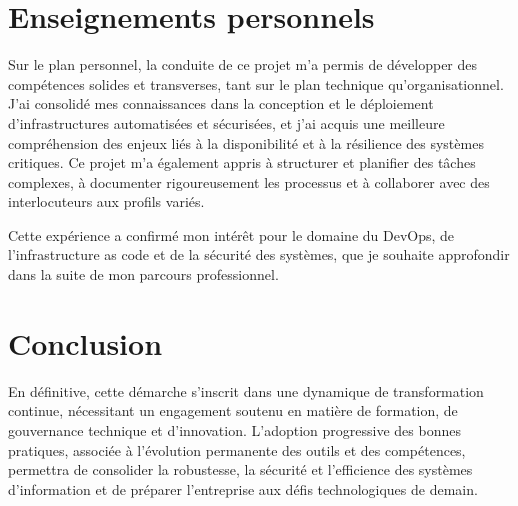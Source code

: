 \section{Enseignements personnels}

Sur le plan personnel, la conduite de ce projet m’a permis de développer des compétences solides et transverses, tant sur le plan technique qu’organisationnel. J’ai consolidé mes connaissances dans la conception et le déploiement d’infrastructures automatisées et sécurisées, et j’ai acquis une meilleure compréhension des enjeux liés à la disponibilité et à la résilience des systèmes critiques. Ce projet m’a également appris à structurer et planifier des tâches complexes, à documenter rigoureusement les processus et à collaborer avec des interlocuteurs aux profils variés.

Cette expérience a confirmé mon intérêt pour le domaine du DevOps, de l’infrastructure as code et de la sécurité des systèmes, que je souhaite approfondir dans la suite de mon parcours professionnel.

\section{Conclusion}

En définitive, cette démarche s’inscrit dans une dynamique de transformation continue, nécessitant un engagement soutenu en matière de formation, de gouvernance technique et d’innovation. L’adoption progressive des bonnes pratiques, associée à l’évolution permanente des outils et des compétences, permettra de consolider la robustesse, la sécurité et l’efficience des systèmes d’information et de préparer l’entreprise aux défis technologiques de demain.
